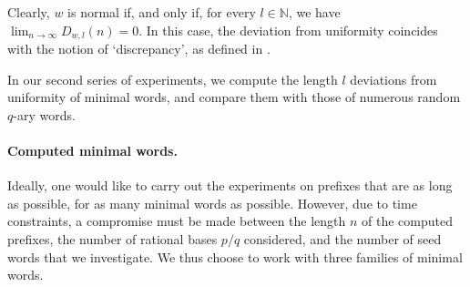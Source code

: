\documentclass{template_arxiv}
\numberwithin{equation}{section}
\newcommand{\N}{\mathbb N}
\begin{document}
Clearly, $w$  is normal if, and only if, for every $l \in \N$, we have $\lim_{n\rightarrow \infty} D_{w,l}(n) = 0$. In this case, the deviation from uniformity coincides with the notion of `discrepancy', as defined in \cite{Sch86}.

In our second series of experiments, we compute the length $l$ deviations from uniformity of minimal words, and compare them with those of numerous random $q$-ary words. 





\paragraph{Computed minimal words.} Ideally, one would like to carry out the experiments on prefixes that are as long as possible, for as many minimal words as possible. However, due to time constraints, a compromise must be made between the length $n$ of the computed prefixes, the number of rational bases $p/q$ considered, and the number of seed words that we investigate. 
We thus choose to work with three families of minimal words. 
\end{document}
